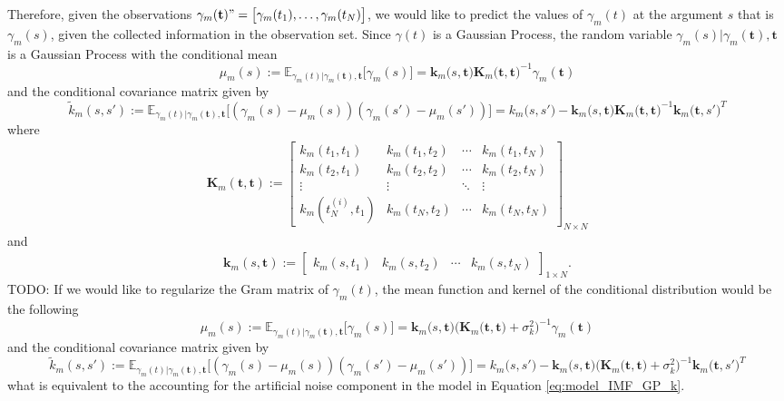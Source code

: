 Therefore, given the observations $\gamma_m(\mathbf{t}) "= \big[ \gamma_m(t_1), \ldots, \gamma_m(t_N) \big]$, we would like to predict the values of $\gamma_m(t)$ at the argument $s$ that is $\gamma_m(s)$, given the collected information in the observation set. Since $\gamma(t)$ is a Gaussian Process, the random variable $\gamma_m(s)| \gamma_m(\mathbf{t}), \mathbf{t}$ is a Gaussian Process with the conditional mean
\begin{equation*}
\mu_m(s):=\mathbb{E}_{\gamma_m(t)|\gamma_m(\mathbf{t}), \mathbf{t}} \big[\gamma_m(s) \big] =  \mathbf{k}_m \big(s,\mathbf{t}\big) \mathbf{K}_m \big(\mathbf{t},\mathbf{t}\big)^{-1} \gamma_m(\mathbf{t})
\end{equation*}
and the conditional covariance matrix given by
\begin{equation*}
\tilde{k}_m(s,s'):= \mathbb{E}_{\gamma_m(t)|\gamma_m(\mathbf{t}), \mathbf{t}} \bigg[(\gamma_m(s) - \mu_m(s))(\gamma_m(s') - \mu_m(s'))\bigg] = k_m \big(s,s'\big) - \mathbf{k}_m\big(s,\mathbf{t}\big) \mathbf{K}_m \big(\mathbf{t},\mathbf{t}\big)^{-1} \mathbf{k}_m \big(\mathbf{t},s'\big) ^T
\end{equation*}
where
\begin{align*}
\mathbf{K}_m (\mathbf{t},\mathbf{t}) := \begin{bmatrix}
k_m(t_1,t_1) & k_m(t_1,t_2)& \cdots & k_m(t_1,t_{N}) \\
k_m(t_2,t_1) & k_m(t_2,t_2)& \cdots & k_m(t_2,t_{N}) \\
\vdots & \vdots & \ddots & \vdots  \\
k_m(t_{N}^{(i)},t_1) & k_m(t_{N},t_2)& \cdots & k_m(t_{N},t_{N}) 
\end{bmatrix}_{ N \times N}
\end{align*}
and
\begin{align*}
\mathbf{k}_m (s,\mathbf{t}) := \begin{bmatrix}
k_m(s,t_1) & k_m(s,t_2)& \cdots & k_m(s,t_{N})
\end{bmatrix}_{ 1 \times N}. 
\end{align*}
{\color{red} TODO:
If we would like to regularize the Gram matrix of $\gamma_m(t)$, the mean function and kernel of the conditional distribution would be the following
\begin{equation*}
\mu_m(s):=\mathbb{E}_{\gamma_m(t)|\gamma_m(\mathbf{t}), \mathbf{t}} \big[\gamma_m(s) \big] =  \mathbf{k}_m \big(s,\mathbf{t}\big) \Big( \mathbf{K}_m \big(\mathbf{t},\mathbf{t}\big) + \sigma^2_k \Big)^{-1} \gamma_m(\mathbf{t})
\end{equation*}
and the conditional covariance matrix given by
\begin{equation*}
\tilde{k}_m(s,s'):= \mathbb{E}_{\gamma_m(t)|\gamma_m(\mathbf{t}), \mathbf{t}} \bigg[(\gamma_m(s) - \mu_m(s))(\gamma_m(s') - \mu_m(s'))\bigg] = k_m \big(s,s'\big) - \mathbf{k}_m\big(s,\mathbf{t}\big) \Big( \mathbf{K}_m \big(\mathbf{t},\mathbf{t}\big) + \sigma_k^2 \Big)^{-1} \mathbf{k}_m \big(\mathbf{t},s'\big) ^T
\end{equation*}  
what is equivalent to the accounting for the artificial noise component in the model in Equation \eqref{eq:model_IMF_GP_k}.}


